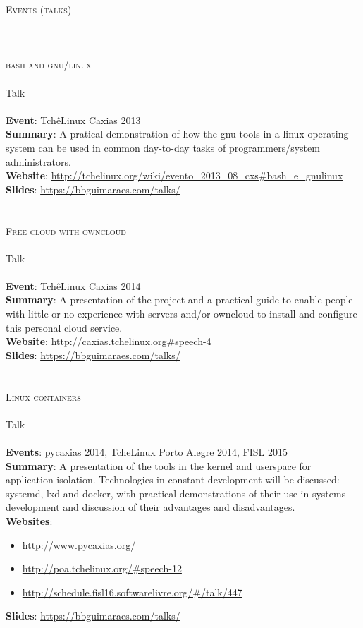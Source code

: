 \noindent \textsc{\Huge Events (talks)}
\\\\\\\\
\noindent \textsc{\Large bash and gnu/linux}
\\\\
Talk
\\\\
\textbf{Event}: TchêLinux Caxias  2013 \\
\textbf{Summary}:
    A pratical demonstration of how the gnu tools in a linux operating system
    can be used in common day-to-day tasks of programmers/system
    administrators. \\
\textbf{Website}:
    \url{http://tchelinux.org/wiki/evento_2013_08_cxs#bash_e_gnulinux} \\
\textbf{Slides}: \url{https://bbguimaraes.com/talks/}
\\\\\\
\noindent \textsc{\Large Free cloud with owncloud}
\\\\
Talk
\\\\
\textbf{Event}: TchêLinux Caxias 2014 \\
\textbf{Summary}:
    A presentation of the project and a practical guide to enable people
    with little or no experience with servers and/or owncloud to install and
    configure this personal cloud service. \\
\textbf{Website}: \url{http://caxias.tchelinux.org#speech-4} \\
\textbf{Slides}: \url{https://bbguimaraes.com/talks/}
\\\\\\
\noindent \textsc{\Large Linux containers}
\\\\
Talk
\\\\
\textbf{Events}: pycaxias 2014, TcheLinux Porto Alegre 2014, FISL 2015 \\
\textbf{Summary}:
    A presentation of the tools in the kernel and userspace for application
    isolation. Technologies in constant development will be discussed: systemd,
    lxd and docker, with practical demonstrations of their use in systems
    development and discussion of their advantages and disadvantages. \\
\textbf{Websites}:
\begin{itemize}
    \vspace{-2.5mm}
    \itemsep-1mm
    \item \url{http://www.pycaxias.org/}
    \item \url{http://poa.tchelinux.org/#speech-12}
    \item \url{http://schedule.fisl16.softwarelivre.org/#/talk/447}
    \vspace{-2.5mm}
\end{itemize}
\textbf{Slides}: \url{https://bbguimaraes.com/talks/}

